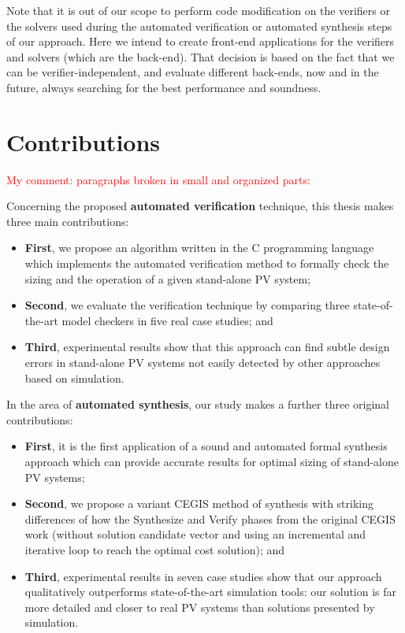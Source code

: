 Note that it is out of our scope to perform code modification on the verifiers or the solvers used during the automated verification or automated synthesis steps of our approach. Here we intend to create front-end applications for the verifiers and solvers (which are the back-end). That decision is based on the fact that we can be verifier-independent, and evaluate different back-ends, now and in the future, always searching for the best performance and soundness.

\section{Contributions}

\textcolor{red}{My comment: paragraphs broken in small and organized parts:}

Concerning the proposed \textbf{automated verification} technique, this thesis makes three main contributions: 
\begin{itemize}
\item \textbf{First}, we propose an algorithm written in the C programming language which implements the automated verification method to formally check the sizing and the operation of a given stand-alone PV system; 
\item \textbf{Second}, we evaluate the verification technique by comparing three state-of-the-art model checkers in five real case studies; and 
\item \textbf{Third}, experimental results show that this approach can find subtle design errors in stand-alone PV systems not easily detected by other approaches based on simulation.
\end{itemize}

In the area of \textbf{automated synthesis}, our study makes a further three original contributions: 
\begin{itemize}
\item \textbf{First}, it is the first application of a sound and automated formal synthesis approach which can provide accurate results for optimal sizing of stand-alone PV systems; 
\item \textbf{Second}, we propose a variant CEGIS method of synthesis with striking differences of how the Synthesize and Verify phases from the original CEGIS work (without solution candidate vector and using an incremental and iterative loop to reach the optimal cost solution); and 
\item \textbf{Third}, experimental results in seven case studies show that our approach qualitatively outperforms state-of-the-art simulation tools: our solution is far more detailed and closer to real PV systems than solutions presented by simulation.
\end{itemize}

